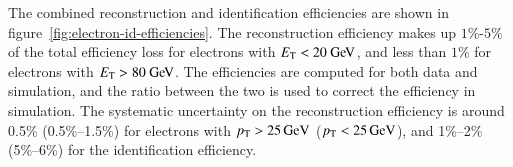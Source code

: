 The combined reconstruction and identification efficiencies are shown in figure~\ref{fig:electron-id-efficiencies}. The reconstruction efficiency makes up $1\%$-$5\%$ of the total efficiency loss for electrons with $\Et<20 \GeV$, and less than $1\%$ for electrons with $\Et>80 \GeV$. The efficiencies are computed for both data and simulation, and the ratio between the two is used to correct the efficiency in simulation. The systematic uncertainty on the reconstruction efficiency is around 0.5\% (0.5\%--1.5\%) for electrons with $p_{\text{T}}>\SI{25}{\giga\electronvolt}$ ($p_{\text{T}}<\SI{25}{\giga\electronvolt}$), and 1\%--2\% (5\%--6\%) for the identification efficiency. 

\begin{figure}[htbp]
	\centering
	\hfill
	\subfloat[] {
}
\end{figure}
